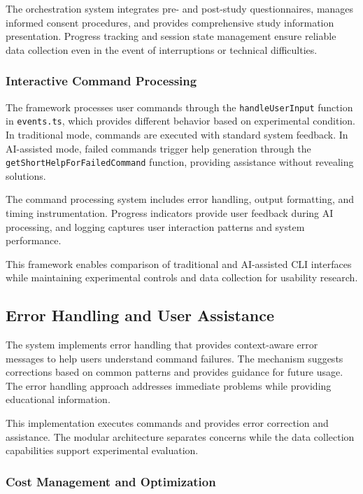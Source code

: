 The orchestration system integrates pre- and post-study questionnaires, manages informed consent procedures, and provides comprehensive study information presentation. Progress tracking and session state management ensure reliable data collection even in the event of interruptions or technical difficulties.

\subsubsection{Interactive Command Processing}

The framework processes user commands through the \texttt{handleUserInput} function in \texttt{events.ts}, which provides different behavior based on experimental condition. In traditional mode, commands are executed with standard system feedback. In AI-assisted mode, failed commands trigger help generation through the \texttt{getShortHelpForFailedCommand} function, providing assistance without revealing solutions.

The command processing system includes error handling, output formatting, and timing instrumentation. Progress indicators provide user feedback during AI processing, and logging captures user interaction patterns and system performance.

This framework enables comparison of traditional and AI-assisted CLI interfaces while maintaining experimental controls and data collection for usability research.

\subsection{Error Handling and User Assistance}

The system implements error handling that provides context-aware error messages to help users understand command failures. The mechanism suggests corrections based on common patterns and provides guidance for future usage. The error handling approach addresses immediate problems while providing educational information.

This implementation executes commands and provides error correction and assistance. The modular architecture separates concerns while the data collection capabilities support experimental evaluation.

\subsubsection{Cost Management and Optimization}

